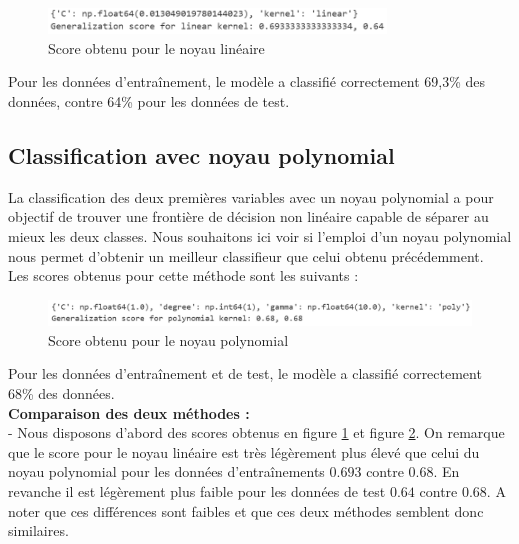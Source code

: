 \documentclass[a4paper,12pt]{article}
\begin{document}
\begin{figure}[H]
    \centering
    \includegraphics[width=0.8\textwidth]{Images/linear_score.png}
    \caption{Score obtenu pour le noyau linéaire}
    \label{fig:linear}
\end{figure}

Pour les données d'entraînement, le modèle a classifié correctement 69,3\% des données, contre 64\% pour les données de test. 


\subsection{Classification avec noyau polynomial}

La classification des deux premières variables avec un noyau polynomial a pour objectif de trouver une frontière de décision non linéaire capable de séparer au mieux les deux classes. 
Nous souhaitons ici voir si l'emploi d'un noyau polynomial nous permet d'obtenir un meilleur classifieur que celui obtenu précédemment.\\
Les scores obtenus pour cette méthode sont les suivants :

\begin{figure}[H]
    \centering
    \includegraphics[width=\textwidth]{Images/poly_score.png}
    \caption{Score obtenu pour le noyau polynomial}
    \label{fig:poly}
\end{figure}

Pour les données d'entraînement et de test, le modèle a classifié correctement 68\% des données. \\

\textbf{Comparaison des deux méthodes :}\\[0.5cm]
- Nous disposons d'abord des scores obtenus en figure \ref{fig:linear} et figure \ref{fig:poly}.
On remarque que le score pour le noyau linéaire est très légèrement plus élevé que celui du noyau polynomial pour les données d'entraînements $0.693$ contre $0.68$.
En revanche il est légèrement plus faible pour les données de test $0.64$ contre $0.68$. A noter que ces différences sont faibles et que ces deux méthodes semblent donc similaires.\\
\end{document}
